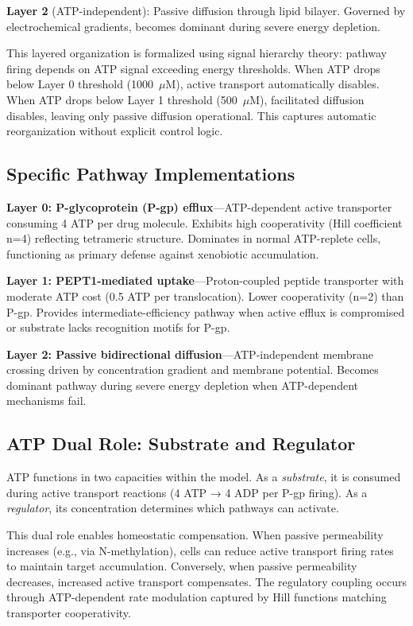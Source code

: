 \documentclass[10pt,letterpaper]{article}
\begin{document}
\textbf{Layer 2} (ATP-independent): Passive diffusion through lipid bilayer. Governed by electrochemical gradients, becomes dominant during severe energy depletion.

This layered organization is formalized using signal hierarchy theory: pathway firing depends on ATP signal exceeding energy thresholds. When ATP drops below Layer 0 threshold (1000~$\mu$M), active transport automatically disables. When ATP drops below Layer 1 threshold (500~$\mu$M), facilitated diffusion disables, leaving only passive diffusion operational. This captures automatic reorganization without explicit control logic.

\subsection{Specific Pathway Implementations}

\textbf{Layer 0: P-glycoprotein (P-gp) efflux}---ATP-dependent active transporter consuming 4 ATP per drug molecule. Exhibits high cooperativity (Hill coefficient n=4) reflecting tetrameric structure. Dominates in normal ATP-replete cells, functioning as primary defense against xenobiotic accumulation.

\textbf{Layer 1: PEPT1-mediated uptake}---Proton-coupled peptide transporter with moderate ATP cost (0.5 ATP per translocation). Lower cooperativity (n=2) than P-gp. Provides intermediate-efficiency pathway when active efflux is compromised or substrate lacks recognition motifs for P-gp.

\textbf{Layer 2: Passive bidirectional diffusion}---ATP-independent membrane crossing driven by concentration gradient and membrane potential. Becomes dominant pathway during severe energy depletion when ATP-dependent mechanisms fail.

\subsection{ATP Dual Role: Substrate and Regulator}

ATP functions in two capacities within the model. As a \textit{substrate}, it is consumed during active transport reactions (4 ATP → 4 ADP per P-gp firing). As a \textit{regulator}, its concentration determines which pathways can activate.

This dual role enables homeostatic compensation. When passive permeability increases (e.g., via N-methylation), cells can reduce active transport firing rates to maintain target accumulation. Conversely, when passive permeability decreases, increased active transport compensates. The regulatory coupling occurs through ATP-dependent rate modulation captured by Hill functions matching transporter cooperativity.
\end{document}
